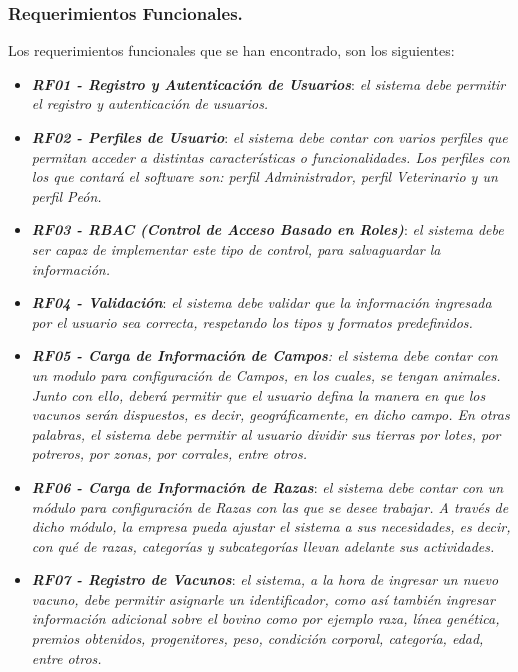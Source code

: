 \documentclass[11pt,oneside]{book}
\begin{document}
\subsubsection{Requerimientos Funcionales.}
Los requerimientos funcionales que se han encontrado, son los siguientes:
\begin{itemize}

\item \textit{\textbf{RF01 - Registro y Autenticación de Usuarios}}: \textit{el sistema debe permitir el registro y autenticación de usuarios.}

\item \textit{\textbf{RF02 - Perfiles de Usuario}}: \textit{el sistema debe contar con varios perfiles que permitan acceder a distintas características o funcionalidades. Los perfiles con los que contará el software son: perfil Administrador, perfil Veterinario y un perfil Peón.}

\item \textit{\textbf{RF03 - RBAC (Control de Acceso Basado en Roles)}}: \textit{el sistema debe ser capaz de implementar este tipo de control, para salvaguardar la información.}

\item \textit{\textbf{RF04 - Validación}}: \textit{el sistema debe validar que la información ingresada por el usuario sea correcta, respetando los tipos y formatos predefinidos.}

\item \textit{\textbf{RF05 - Carga de Información de Campos}: el sistema debe contar con un modulo para configuración de Campos, en los cuales, se tengan animales. Junto con ello, deberá permitir que el usuario defina la manera en que los vacunos serán dispuestos, es decir, geográficamente, en dicho campo. En otras palabras, el sistema debe permitir al usuario dividir sus tierras por lotes, por potreros, por zonas, por corrales, entre otros.}

\item \textit{\textbf{RF06 - Carga de Información de Razas}}: \textit{el sistema debe contar con un módulo para configuración de Razas con las que se desee trabajar. A través de dicho módulo, la empresa pueda ajustar el sistema a sus necesidades, es decir, con qué de razas, categorías y subcategorías llevan adelante sus actividades.}

\item \textit{\textbf{RF07 - Registro de Vacunos}}: \textit{el sistema, a la hora de ingresar un nuevo vacuno, debe permitir asignarle un identificador, como así también ingresar información adicional sobre el bovino como por ejemplo raza, línea genética, premios obtenidos, progenitores, peso, condición corporal, categoría, edad, entre otros.}


\end{itemize}
\end{document}
